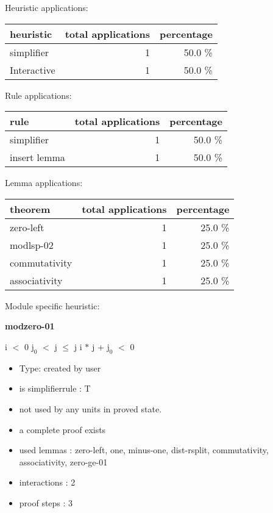 \documentclass[a4paper]{article}
\begin{document}
\medskip


Heuristic applications:

\begin{supertabular}{l|r|r}
heuristic	& total applications & percentage \\ \hline
simplifier & 1 & 50.0 \% \\
Interactive & 1 & 50.0 \% \\

\end{supertabular}

Rule applications:

\begin{supertabular}{l|r|r}
rule	        & total applications & percentage \\ \hline
simplifier & 1 & 50.0 \% \\
insert lemma & 1 & 50.0 \% \\

\end{supertabular}

Lemma applications:

\begin{supertabular}{l|r|r}
theorem	        & total applications & percentage \\ \hline
zero-left & 1 & 25.0 \% \\
modlsp-02 & 1 & 25.0 \% \\
commutativity & 1 & 25.0 \% \\
associativity & 1 & 25.0 \% \\

\end{supertabular}

Module specific heuristic:

\pagebreak

{\LARGE\bf modzero-01}\label{lemma-modzero-01}

\medskip

 \Fol i $<$ 0 \And $\mbox{j}_{0}$ $<$ j  $\le$ j \Imp i $*$ j + $\mbox{j}_{0}$ $<$ 0

\begin{itemize}

\item Type: created by user

\item is simplifierrule : T
\item not used by any units in proved state.
\item       a complete proof exists
\item       used lemmas  : zero-left, one, minus-one, dist-rsplit, commutativity, associativity, zero-ge-01
\item       interactions : 2
\item       proof steps  : 3
\end{itemize}
\end{document}
